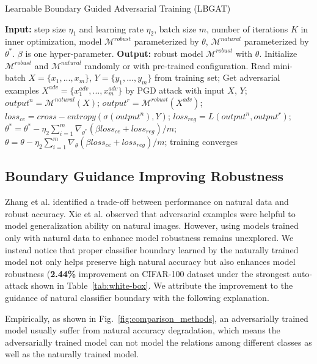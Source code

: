 \documentclass[10pt,twocolumn,letterpaper]{article}
\begin{document}
\begin{algorithm}[t]
	\caption{Learnable Boundary Guided Adversarial Training (LBGAT)}
	\label{algorithm_LBGAT}
	\begin{algorithmic}[1]
		\State \textbf{Input:} step size $\eta_{1}$ and learning rate $\eta_{2}$, batch size $m$, number of iterations $K$ in inner optimization, model $\mathcal{M}^{robust}$ parameterized by $\theta$, $\mathcal{M}^{natural}$ parameterized by $\theta^{*}$. $\beta$ is one hyper-parameter.
		\State \textbf{Output:} robust model $\mathcal{M}^{robust}$ with $\theta$.
		\State Initialize $\mathcal{M}^{robust}$ and $\mathcal{M}^{natural}$ randomly or with pre-trained configuration.
		\Repeat
		\State Read mini-batch $X=\{x_{1}, ..., x_{m}\}$, $Y=\{y_{1}, ..., y_{m}\}$ from training set;
		\State Get adversarial examples $X^{adv} = \{x_{1}^{adv}, ..., x_{m}^{adv} \}$ by PGD attack with input $X$, $Y$;
		\State $output^{n}=\mathcal{M}^{natural}(X)$;
		\State $output^{r}=\mathcal{M}^{robust}(X^{adv})$;
		\State $loss_{ce}=cross-entropy(\sigma(output^{n}), Y)$;
		\State $loss_{reg}=L(output^{n}, output^{r})$;
		\State $\theta^{*}= \theta^{*} - \eta_{2} \sum_{i=1}^{m} \nabla_{\theta^{*}} (\beta loss_{ce}+ loss_{reg}) /m$;
		\State $\theta= \theta - \eta_{2} \sum_{i=1}^{m} \nabla_{\theta} (\beta loss_{ce}+ loss_{reg}) /m$;
		\Until training converges
	\end{algorithmic}
\end{algorithm}

\subsection{Boundary Guidance Improving Robustness} 
Zhang et al. \cite{zhang2019theoretically} identified a trade-off between performance on natural data and robust accuracy. Xie et al. \cite{xie2020adversarial} observed that adversarial examples were helpful to model generalization ability on natural images. However, using models trained only with natural data to enhance model robustness remains unexplored. We instead notice that proper classifier boundary learned by the naturally trained model not only helps preserve high natural accuracy but also enhances model robustness (\textbf{2.44\%} improvement on CIFAR-100 dataset under the strongest auto-attack \cite{croce2020reliable} shown in Table~\ref{tab:white-box}. We attribute the improvement to the guidance of natural classifier boundary with the following explanation. 

Empirically, as shown in Fig.~\ref{fig:comparison_methods}, an adversarially trained model usually suffer from natural accuracy degradation, which means the adversarially trained model can not model the relations among different classes as well as the naturally trained model.
\end{document}
